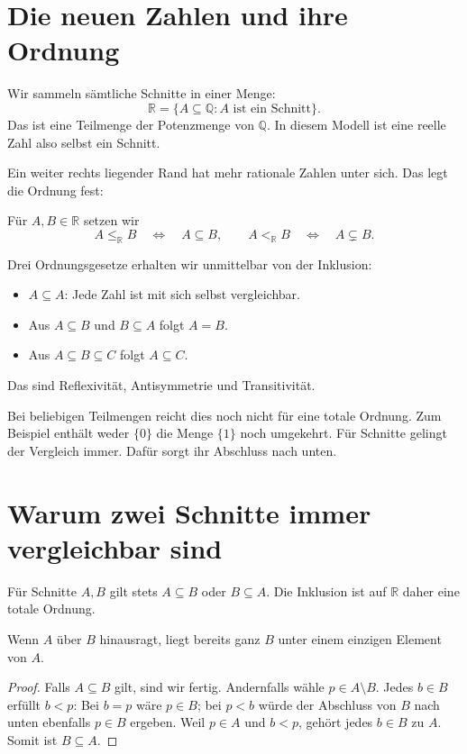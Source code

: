 \clearpage
\section{Die neuen Zahlen und ihre Ordnung}
\label{cuts:order}

Wir sammeln sämtliche Schnitte in einer Menge:
\[
 \mathbb R=\{A\subseteq\mathbb Q:A\text{ ist ein Schnitt}\}.
\]
Das ist eine Teilmenge der Potenzmenge von $\mathbb Q$.
In diesem Modell ist eine reelle Zahl also selbst ein Schnitt.

Ein weiter rechts liegender Rand hat mehr rationale Zahlen unter sich.
Das legt die Ordnung fest:
\begin{definition}
Für $A,B\in\mathbb R$ setzen wir
\[
 A\leq_{\mathbb R}B\quad\Longleftrightarrow\quad A\subseteq B,
 \qquad
 A<_{\mathbb R}B\quad\Longleftrightarrow\quad A\subsetneq B.
\]
\end{definition}

Drei Ordnungsgesetze erhalten wir unmittelbar von der Inklusion:
\begin{itemize}
 \item $A\subseteq A$: Jede Zahl ist mit sich selbst vergleichbar.
 \item Aus $A\subseteq B$ und $B\subseteq A$ folgt $A=B$.
 \item Aus $A\subseteq B\subseteq C$ folgt $A\subseteq C$.
\end{itemize}
Das sind Reflexivität, Antisymmetrie und Transitivität.

Bei beliebigen Teilmengen reicht dies noch nicht für eine totale Ordnung.
Zum Beispiel enthält weder $\{0\}$ die Menge $\{1\}$ noch umgekehrt.
Für Schnitte gelingt der Vergleich immer. Dafür sorgt ihr
Abschluss nach unten.

\clearpage
\section{Warum zwei Schnitte immer vergleichbar sind}
\label{cuts:total}

\begin{satz}
Für Schnitte $A,B$ gilt stets $A\subseteq B$ oder $B\subseteq A$.
Die Inklusion ist auf $\mathbb R$ daher eine totale Ordnung.
\end{satz}

\Beweisidee Wenn $A$ über $B$ hinausragt, liegt bereits ganz $B$ unter
einem einzigen Element von $A$.

\begin{proof}
Falls $A\subseteq B$ gilt, sind wir fertig. Andernfalls wähle
$p\in A\setminus B$. Jedes $b\in B$ erfüllt $b<p$:
Bei $b=p$ wäre $p\in B$; bei $p<b$ würde der Abschluss von $B$
nach unten ebenfalls $p\in B$ ergeben.
Weil $p\in A$ und $b<p$, gehört jedes $b\in B$ zu $A$.
Somit ist $B\subseteq A$.
\end{proof}

